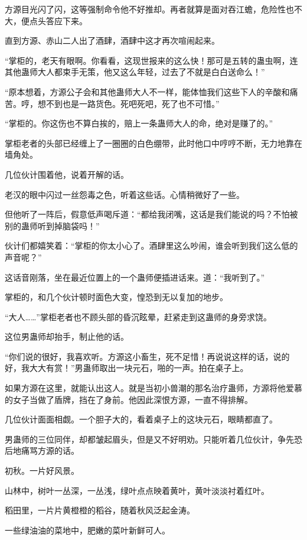 \begin{this_body}
方源目光闪了闪，这等强制命令他不好推却。再者就算是面对吞江蟾，危险性也不大，便点头答应下来。

直到方源、赤山二人出了酒肆，酒肆中这才再次喧闹起来。

“掌柜的，老天有眼啊。你看看，这现世报来的这么快！那可是五转的蛊虫啊，连其他蛊师大人都束手无策，他又这么年轻，过去了不就是白白送命么！”

“原本想着，方源公子会和其他蛊师大人不一样，能体恤我们这些下人的辛酸和痛苦。哼，想不到也是一路货色。死吧死吧，死了也不可惜。”

“掌柜的。你这伤也不算白挨的，赔上一条蛊师大人的命，绝对是赚了的。”

掌柜老者的头部已经缠上了一圈圈的白色绷带，此时他口中哼哼不断，无力地靠在墙角处。

几位伙计围着他，说着开解的话。

老汉的眼中闪过一丝怨毒之色，听着这些话。心情稍微好了一些。

但他听了一阵后，假意低声喝斥道：“都给我闭嘴，这话是我们能说的吗？不怕被别的蛊师听到掉脑袋吗！”

伙计们都嬉笑着：“掌柜的你太小心了。酒肆里这么吵闹，谁会听到我们这么低的声音呢？”

这话音刚落，坐在最近位置上的一个蛊师便插进话来。道：“我听到了。”

掌柜的，和几个伙计顿时面色大变，惶恐到无以复加的地步。

“大人……”掌柜老者也不顾头部的昏沉眩晕，赶紧走到这蛊师的身旁求饶。

这位男蛊师却抬手，制止他的话。

“你们说的很好，我喜欢听。方源这小畜生，死不足惜！再说说这样的话，说的好，我大大有赏！”男蛊师取出一块元石，啪的一声。拍在桌子上。

如果方源在这里，就能认出这人。就是当初小兽潮的那名治疗蛊师，方源将他爱慕的女子当做了盾牌，挡在了身前。他因此深恨方源，一直不得排解。

几位伙计面面相觑。一个胆子大的，看着桌子上的这块元石，眼睛都直了。

男蛊师的三位同伴，却都皱起眉头，但是又不好明劝。只能听着几位伙计，争先恐后地痛骂方源的话。

初秋。一片好风景。

山林中，树叶一丛深，一丛浅，绿叶点点映着黄叶，黄叶淡淡衬着红叶。

稻田里，一片片黄橙橙的稻谷，随着秋风泛起金涛。

一些绿油油的菜地中，肥嫩的菜叶新鲜可人。


\end{this_body}

